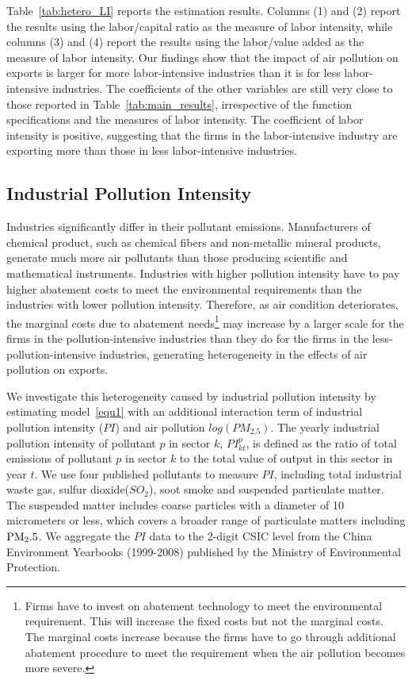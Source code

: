 \documentclass[12pt]{article}
\begin{document}
Table~\ref{tab:hetero_LI} reports the estimation results. Columns (1) and (2) report the results using the labor/capital ratio as the measure of labor intensity, while columns (3) and (4) report the results using the labor/value added as the measure of labor intensity. Our findings show that the impact of air pollution on exports is larger for more labor-intensive industries than it is for less labor-intensive industries. The coefficients of the other variables are still very close to those reported in Table~\ref{tab:main_results}, irrespective of the function specifications and the measures of labor intensity. The coefficient of labor intensity is positive, suggesting that the firms in the labor-intensive industry are exporting more than those in less labor-intensive industries. 
 \subsection{Industrial Pollution Intensity} \label{sec:5.2.3}
Industries significantly differ in their pollutant emissions. Manufacturers of chemical product, such as chemical fibers and non-metallic mineral products, generate much more air pollutants than those producing scientific and mathematical instruments. Industries with higher pollution intensity have to pay higher abatement costs to meet the environmental requirements than the industries with lower pollution intensity. Therefore, as air condition deteriorates, the marginal costs due to abatement needs\footnote{Firms have to invest on abatement technology to meet the environmental requirement. This will increase the fixed costs but not the marginal costs. The marginal costs increase because the firms have to go through additional abatement procedure to meet the requirement when the air pollution becomes more severe.} may increase by a larger scale for the firms in the pollution-intensive industries than they do for the firms in the less-pollution-intensive industries, generating heterogeneity in the effects of air pollution on exports.  

We investigate this heterogeneity caused by industrial pollution intensity by estimating model~\ref{equ1} with an additional interaction term of industrial pollution intensity ($PI$) and air pollution $log(PM_{2.5})$. The yearly industrial pollution intensity of pollutant $p$ in sector $k$, $PI^{p}_{kt}$, is defined as the ratio of total emissions of pollutant $p$ in sector $k$ to the total value of output in this sector in year $t$. We use four published pollutants to measure $PI$, including total industrial waste gas, sulfur dioxide($SO_{2}$), soot smoke and suspended particulate matter. The suspended matter includes coarse particles with a diameter of 10 micrometers or less, which covers a broader range of particulate matters including $\rm PM_2.5$.  
We aggregate the $PI$ data to the 2-digit CSIC level from the China Environment Yearbooks (1999-2008) published by the Ministry of Environmental Protection. 
\end{document}
